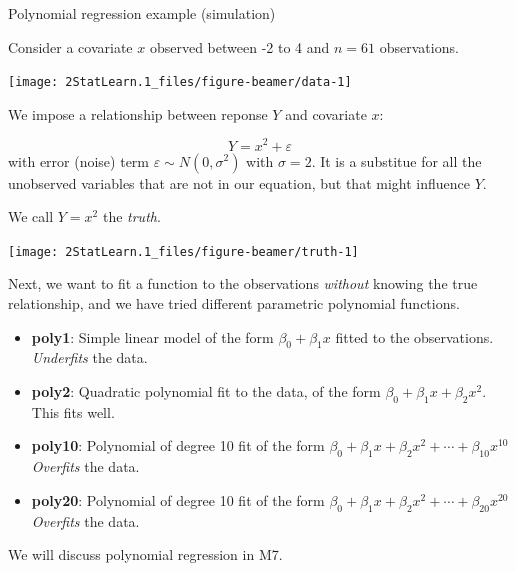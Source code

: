 \documentclass[ignorenonframetext,]{beamer}
\begin{document}
\begin{frame}

\begin{block}{Polynomial regression example (simulation)}

Consider a covariate \(x\) observed between -2 to 4 and \(n=61\)
observations.

\begin{center}\texttt{[image: 2StatLearn.1\_files/figure-beamer/data-1]} \end{center}

\end{block}

\end{frame}

\begin{frame}

We impose a relationship between reponse \(Y\) and covariate \(x\):

\[ Y=x^2 + \varepsilon\] with error (noise) term
\(\varepsilon\sim N(0,\sigma^2)\) with \(\sigma=2\). It is a substitue
for all the unobserved variables that are not in our equation, but that
might influence \(Y\).

We call \(Y=x^2\) the \emph{truth}.

\end{frame}

\begin{frame}

\begin{center}\texttt{[image: 2StatLearn.1\_files/figure-beamer/truth-1]} \end{center}

\end{frame}

\begin{frame}

Next, we want to fit a function to the observations \emph{without}
knowing the true relationship, and we have tried different parametric
polynomial functions.

\begin{itemize}
\item
  \textbf{poly1}: Simple linear model of the form \(\beta_0+\beta_1 x\)
  fitted to the observations. \emph{Underfits} the data.
\item
  \textbf{poly2}: Quadratic polynomial fit to the data, of the form
  \(\beta_0+\beta_1 x +\beta_2 x^2\). This fits well.
\item
  \textbf{poly10}: Polynomial of degree 10 fit of the form
  \(\beta_0+\beta_1 x +\beta_2 x^2+\cdots +\beta_{10}x^{10}\)
  \emph{Overfits} the data.
\item
  \textbf{poly20}: Polynomial of degree 10 fit of the form
  \(\beta_0+\beta_1 x +\beta_2 x^2+\cdots +\beta_{20}x^{20}\)
  \emph{Overfits} the data.
\end{itemize}

We will discuss polynomial regression in M7.

\end{frame}
\end{document}
